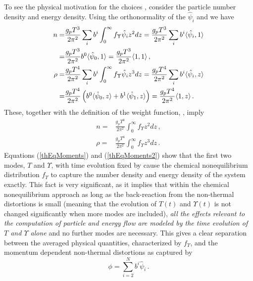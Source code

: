 To see the physical motivation for the choices , consider the particle number density and energy density.  Using the orthonormality of the $\hat\psi_i$ and  we have
\begin{align}
n=&\frac{g_pT^3}{2\pi^2}\sum_ib^i\int_0^\infty f_\Upsilon  \hat\psi_i z^2 dz=\frac{g_pT^3}{2\pi^2}\sum_ib^i\langle \hat\psi_i ,1\rangle\\
=&\frac{g_pT^3}{2\pi^2}b^0\langle \hat\psi_0 ,1\rangle=\frac{g_pT^3}{2\pi^2}\langle 1 ,1\rangle\,,\notag\\
\rho=&\frac{g_pT^4}{2\pi^2}\sum_ib^i\int_0^\infty f_\Upsilon  \hat\psi_i z^3 dz=\frac{g_pT^4}{2\pi^2}\sum_ib^i\langle\hat\psi_i, z\rangle\\
=&\frac{g_pT^4}{2\pi^2}\left(b^0\langle\hat\psi_0, z\rangle+b^1\langle\hat\psi_1, z\rangle\right)=
\frac{g_pT^4}{2\pi^2}\langle 1,z\rangle\,.\notag
\end{align}
These, together with the definition of the weight function, , imply
\begin{align}\label{thEqMoments}
n=&\frac{g_pT^3}{2\pi^2}\int_0^\infty f_\Upsilon  z^2dz\,,\\
\label{thEqMoments2}
\rho=&\frac{g_pT^4}{2\pi^2}\int_0^\infty f_\Upsilon  z^3dz\,.
\end{align}
Equations (\ref{thEqMoments}) and (\ref{thEqMoments2}) show  that the first two modes, $T$ and $\Upsilon$, with time evolution fixed by  cause the chemical nonequilibrium distribution $f_\Upsilon $ to capture the number density and energy density of the system exactly.  This fact is very significant, as it implies that within the chemical nonequilibrium approach as long as the back-reaction from the non-thermal distortions is small (meaning that the evolution of $T(t)$ and $\Upsilon(t)$ is not changed significantly when more modes are included), {\em all the effects relevant to the computation of  particle and energy flow are modeled by the time evolution of $T$ and $\Upsilon$ alone} and no further modes are necessary.  This gives a clear separation between the averaged physical quantities, characterized by $f_\Upsilon $, and the momentum dependent non-thermal distortions as captured by 
\begin{equation}
\phi=\sum_{i=2}^N b^i\hat\psi_i\,.
\end{equation}

